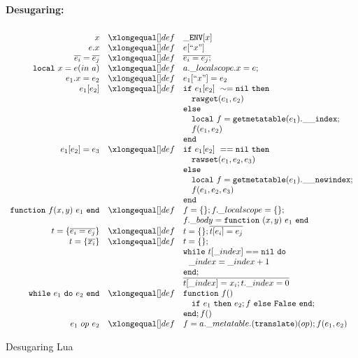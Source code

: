 \begin{figure}[P]
\caption{Desugaring Lua}
{\bf Desugaring:}
\label{fig:desLua}
\[
\begin{array}{rclcl}
\\

\desugar{x}{{\tt \_ENV}[x]}
\desugar{e.x}{e[``x"]}
\desugar{\overline{e_i}=\overline{e_j}}{\overline{e_i = e_j;}}
\desugar{{\tt local}~x=e(in~a)}{a.\_localscope.x = e;}
\desugar{e_1.x=e_2}{e_1[``x"] = e_2}
\desugar{e_1[e_2]}{{\tt if}~ e_1[e_2] ~\sim= {\tt nil} ~ {\tt then}\\}
\desugarline{ 
     \quad{\tt rawget}(e_1, e_2) ~\\
     {\tt else}\\
     \quad{\tt local}~f = {\tt getmetatable}(e_1).{\tt{\_}{\_}index};\\
     \quad f(e_1,e_2)\\ 
     {\tt end}\\
}
\desugar{e_1[e_2]=e_3}{
    {\tt if}~ e_1[e_2] ~== {\tt nil} ~ {\tt then}\\
}
\desugarline{  
     \quad{\tt rawset}(e_1, e_2,e_3) ~\\
     {\tt else}\\
     \quad{\tt local}~f = {\tt getmetatable}(e_1).{\tt{\_}{\_}newindex};\\
     \quad f(e_1,e_2,e_3)\\ 
     {\tt end}\\
 
}
\desugar{{\tt function}~f(x,y)~e_1~{\tt end}}{f = \{\}; f.\_localscope = \{\};}
\desugarline{f.\_body = {\tt function}~(x,y)~e_1~{\tt end}}
\desugar{t = \{\overline{e_i = e_j}\}}{t = \{\}; \overline{t[e_i]=e_j}}
\desugar{t = \{\overline{x_i}\}}{t = \{\};}
\desugarline{ {\tt while}~t[\_index] == {\tt nil~do}}
\desugarline{ ~~\_index = \_index + 1~ }
\desugarline{{\tt end};}
\desugarline{ \overline{t[\_index] = x_i; t.\_index = 0}}

\desugar{{\tt while}~e_1~{\tt do}~e_2~{\tt end}}{
    {\tt function}~f()
}
\desugarline{ \quad{\tt if}~e_1~{\tt then}~e_2;f~{\tt else}~{\tt False}~{\tt end};\\
{\tt end};f()
}
\desugar{
    e_1~ op ~e_2
}{
    f = a.\_metatable.({\tt translate})(op); f(e_1, e_2)
}
\end{array}\]
\end{figure}








